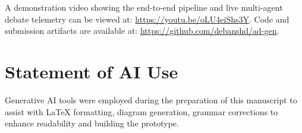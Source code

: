 \documentclass[sigconf]{acmart}
\begin{document}
A demonstration video showing the end-to-end pipeline and live multi-agent debate telemetry can be viewed at: \url{https://youtu.be/oLU4eiShs3Y}. Code and submission artifacts are available at: \url{https://github.com/debanshd/ad-gen}.

\section*{Statement of AI Use}

Generative AI tools were employed during the preparation of this manuscript to assist with LaTeX formatting, diagram generation, grammar corrections to enhance readability and building the prototype.

\end{document}
